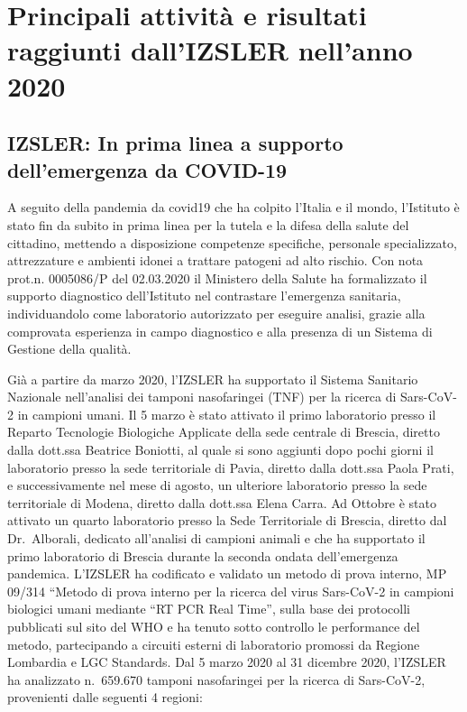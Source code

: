 \documentclass[
  12pt,
]{article}
\begin{document}
\hypertarget{principali-attivituxe0-e-risultati-raggiunti-dallizsler-nellanno-2020}{%
\section{Principali attività e risultati raggiunti dall'IZSLER nell'anno
2020}\label{principali-attivituxe0-e-risultati-raggiunti-dallizsler-nellanno-2020}}

\hypertarget{izsler-in-prima-linea-a-supporto-dellemergenza-da-covid-19}{%
\subsection{IZSLER: In prima linea a supporto dell'emergenza da
COVID-19}\label{izsler-in-prima-linea-a-supporto-dellemergenza-da-covid-19}}

A seguito della pandemia da covid19 che ha colpito l'Italia e il mondo,
l'Istituto è stato fin da subito in prima linea per la tutela e la
difesa della salute del cittadino, mettendo a disposizione competenze
specifiche, personale specializzato, attrezzature e ambienti idonei a
trattare patogeni ad alto rischio. Con nota prot.n. 0005086/P del
02.03.2020 il Ministero della Salute ha formalizzato il supporto
diagnostico dell'Istituto nel contrastare l'emergenza sanitaria,
individuandolo come laboratorio autorizzato per eseguire analisi, grazie
alla comprovata esperienza in campo diagnostico e alla presenza di un
Sistema di Gestione della qualità.

Già a partire da marzo 2020, l'IZSLER ha supportato il Sistema Sanitario
Nazionale nell'analisi dei tamponi nasofaringei (TNF) per la ricerca di
Sars-CoV-2 in campioni umani. Il 5 marzo è stato attivato il primo
laboratorio presso il Reparto Tecnologie Biologiche Applicate della sede
centrale di Brescia, diretto dalla dott.ssa Beatrice Boniotti, al quale
si sono aggiunti dopo pochi giorni il laboratorio presso la sede
territoriale di Pavia, diretto dalla dott.ssa Paola Prati, e
successivamente nel mese di agosto, un ulteriore laboratorio presso la
sede territoriale di Modena, diretto dalla dott.ssa Elena Carra. Ad
Ottobre è stato attivato un quarto laboratorio presso la Sede
Territoriale di Brescia, diretto dal Dr.~Alborali, dedicato all'analisi
di campioni animali e che ha supportato il primo laboratorio di Brescia
durante la seconda ondata dell'emergenza pandemica. L'IZSLER ha
codificato e validato un metodo di prova interno, MP 09/314 ``Metodo di
prova interno per la ricerca del virus Sars-CoV-2 in campioni biologici
umani mediante ``RT PCR Real Time'', sulla base dei protocolli
pubblicati sul sito del WHO e ha tenuto sotto controllo le performance
del metodo, partecipando a circuiti esterni di laboratorio promossi da
Regione Lombardia e LGC Standards. Dal 5 marzo 2020 al 31 dicembre 2020,
l'IZSLER ha analizzato n.~659.670 tamponi nasofaringei per la ricerca di
Sars-CoV-2, provenienti dalle seguenti 4 regioni:
\end{document}
